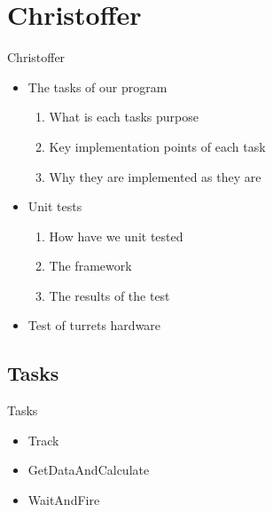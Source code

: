 \section{Christoffer}
\begin{frame}{Christoffer}
\begin{itemize}
\end{itemize}
\end{frame}

\begin{frame}{}
\begin{itemize}
  \item The tasks of our program
  		\begin{enumerate}
  			\item What is each tasks purpose
  			\item Key implementation points of each task
  			\item Why they are implemented as they are  
		\end{enumerate}
  \item Unit tests
  		\begin{enumerate}
  			\item How have we unit tested
  			\item The framework
  			\item The results of the test
		\end{enumerate}
  \item Test of turrets hardware
\end{itemize}
\end{frame}

\subsection{Tasks}
\begin{frame}{Tasks}
\begin{itemize}
  \item Track
  \item GetDataAndCalculate
  \item WaitAndFire
\end{itemize}
\end{frame}

